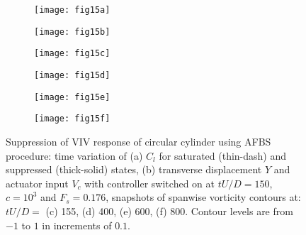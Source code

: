 \documentclass[standard]{jfm}
\begin{document}
\begin{figure}
\centering
\begin{subfigure}[b]{0.495\textwidth} 
\centering
  \texttt{[image: fig15a]}
	\caption{}
	\label{fig:viv_lco_viv}
	\end{subfigure}	
\begin{subfigure}[b]{0.495\textwidth}
\centering
  \texttt{[image: fig15b]}
    \caption{}
    \label{fig:viv_lco_y}
    \end{subfigure} 
\begin{subfigure}[b]{0.495\textwidth} 
\centering
  \texttt{[image: fig15c]}
	\caption{}
	\label{fig:viv_vor1}
	\end{subfigure}	
\begin{subfigure}[b]{0.495\textwidth} 
\centering
  \texttt{[image: fig15d]}
	\caption{}
	\label{fig:viv_vor2}
	\end{subfigure}	
\begin{subfigure}[b]{0.495\textwidth} 
\centering
  \texttt{[image: fig15e]}
	\caption{}
	\label{fig:viv_vor3}
	\end{subfigure}	
\begin{subfigure}[b]{0.495\textwidth} 
\centering
  \texttt{[image: fig15f]}
	\caption{}
	\label{fig:viv_vor4}
	\end{subfigure}	
        \caption{Suppression of VIV response of circular cylinder using AFBS procedure: 
        time variation of 
        (a) $C_l$ for saturated (thin-dash) and suppressed (thick-solid) states, 
        (b) transverse displacement $Y$ and actuator input $V_c$ 
        with controller switched on at $tU/D=150$, $c=10^3$ and $F_s=0.176$,
        snapshots of spanwise vorticity contours at: 
        $tU/D=$ (c) 155, (d) 400, (e) 600, (f) 800. 
        Contour levels are from $-1$ to $1$ in increments of $0.1$.}
        \label{fig:viv_cl_y_uc}
\end{figure}
\end{document}
